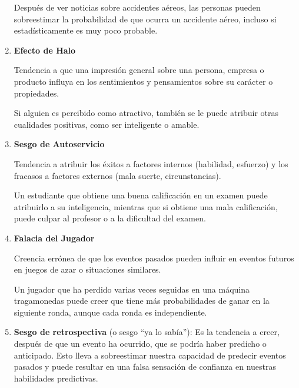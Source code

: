 \begin{enumerate}
	\begin{example} Después de ver noticias sobre accidentes aéreos, las personas pueden sobreestimar la probabilidad de que ocurra un accidente aéreo, incluso si estadísticamente es muy poco probable.
	\end{example}
	
	\item \textbf{Efecto de Halo}
	
	Tendencia a que una impresión general sobre una persona, empresa o producto influya en los sentimientos y pensamientos sobre su carácter o propiedades.
	
	\begin{example}
		Si alguien es percibido como atractivo, también se le puede atribuir otras cualidades positivas, como ser inteligente o amable.
	\end{example}
	
	\item \textbf{Sesgo de Autoservicio}
	
	Tendencia a atribuir los éxitos a factores internos (habilidad, esfuerzo) y los fracasos a factores externos (mala suerte, circunstancias).
	
	\begin{example}
		Un estudiante que obtiene una buena calificación en un examen puede atribuirlo a su inteligencia, mientras que si obtiene una mala calificación, puede culpar al profesor o a la dificultad del examen.
	\end{example}
	
	\item \textbf{Falacia del Jugador}
	
	Creencia errónea de que los eventos pasados ​​pueden influir en eventos futuros en juegos de azar o situaciones similares.
	
	\begin{example}Un jugador que ha perdido varias veces seguidas en una máquina tragamonedas puede creer que tiene más probabilidades de ganar en la siguiente ronda, aunque cada ronda es independiente.
	\end{example}
	
	\item \textbf{Sesgo de retrospectiva} (o sesgo ``ya lo sabía''): Es la tendencia a creer, después de que un evento ha ocurrido, que se podría haber predicho o anticipado. Esto lleva a sobreestimar nuestra capacidad de predecir eventos pasados y puede resultar en una falsa sensación de confianza en nuestras habilidades predictivas.
	

\end{enumerate}
